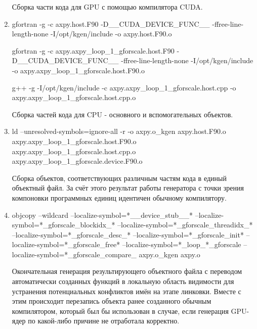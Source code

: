 \documentclass[a4,12pt]{report}
\begin{document}
\begin{enumerate}
Сборка части кода для GPU с помощью компилятора CUDA.

\item

\begin{code}
gfortran -g -c axpy.host.F90 -D__CUDA_DEVICE_FUNC__
-ffree-line-length-none -I/opt/kgen/include -o axpy.host.F90.o

gfortran -g -c axpy.axpy_loop_1_gforscale.host.F90
-D__CUDA_DEVICE_FUNC__ -ffree-line-length-none -I/opt/kgen/include -o
axpy.axpy_loop_1_gforscale.host.F90.o

g++ -g -I/opt/kgen/include -c axpy.axpy_loop_1_gforscale.host.cpp -o
axpy.axpy_loop_1_gforscale.host.cpp.o
\end{code}

Сборка частей кода для CPU - основного и вспомогательных объектов.

\item

\begin{code}
ld --unresolved-symbols=ignore-all -r -o axpy.o_kgen axpy.host.F90.o
axpy.axpy_loop_1_gforscale.host.F90.o
axpy.axpy_loop_1_gforscale.host.cpp.o
axpy.axpy_loop_1_gforscale.device.F90.o
\end{code}

Сборка объектов, соответствующих различным частям кода в единый объектный файл. За счёт этого результат работы генератора с точки зрения компоновки программных единиц идентичен обычному компилятору.

\item

\begin{code}
objcopy --wildcard
--localize-symbol=*__device_stub__*
--localize-symbol=*_gforscale_blockidx_*
--localize-symbol=*_gforscale_threadidx_*
--localize-symbol=*_gforscale_desc_*
--localize-symbol=*_gforscale_init*
--localize-symbol=*_gforscale_free*
--localize-symbol=*_loop_*_gforscale
--localize-symbol=*_gforscale_compare_ axpy.o_kgen axpy.o
\end{code}

Окончательная генерация результирующего объектного файла с переводом автоматически созданных функций в локальную область видимости для устранения потенциальных конфликтов имён на этапе линковки. Вместе с этим происходит перезапись объекта ранее созданного обычным компилятором, который был бы использован в случае, если генерация GPU-ядер по какой-либо причине не отработала корректно.

\end{enumerate}
\end{document}
